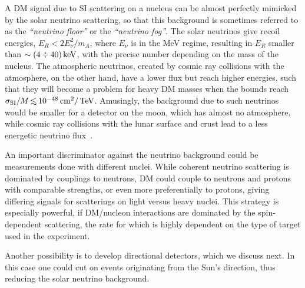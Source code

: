 A DM signal due to SI scattering on a nucleus can be almost perfectly mimicked by the solar neutrino scattering, so that this background is sometimes referred to as the {\em``neutrino floor''} or the {\em ``neutrino fog''}. The solar neutrinos
give recoil energies, $E_R < 2E_\nu^2/m_A$, where $E_\nu$ is in the MeV regime, resulting in $E_R$
smaller than $\sim (4\div 40)\,{\rm keV}$, with the precise number depending on the mass of the nucleus. The  atmospheric neutrinos, created by cosmic ray collisions with the atmosphere, on the other hand, have a lower flux but reach higher energies, such that they will become a problem for heavy DM masses when the bounds reach $\sigma_{\rm SI}/M \circa{<}10^{-48}\cm^2/\TeV$.
Amusingly, the background due to such neutrinos would be smaller
for a detector on the moon, which has almost no atmosphere, while cosmic ray collisions with the lunar surface and crust lead to a less energetic neutrino flux~\cite{2305.04943}.


An important discriminator against the neutrino background could be measurements done with different nuclei. While coherent neutrino scattering is dominated by couplings to neutrons, DM could couple to neutrons and protons with comparable strengths, or even more preferentially to protons, giving differing signals for scatterings on light versus 
heavy nuclei. This strategy is especially powerful, if DM/nucleon interactions are dominated by the spin-dependent scattering, the rate for which is highly dependent on the type of target used in the experiment. 

Another possibility is to develop directional detectors, which we discuss next. In this case one could cut on events originating from the Sun's direction, thus reducing the solar neutrino background. 



